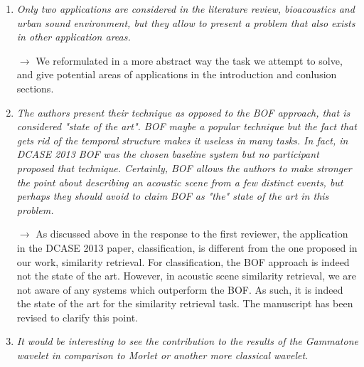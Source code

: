 \documentclass[10pt]{article}
\begin{document}
\begin{enumerate}

\item \emph{Only two applications are considered in the literature review, bioacoustics and urban sound environment, but they allow to present a problem that also exists in other application areas.}

$\rightarrow$ We reformulated in a more abstract way the task we attempt to solve, and give potential areas of applications in the introduction and conlusion sections.

\item \emph{The authors present their technique as opposed to the BOF approach, that is considered "state of the art". BOF maybe a popular technique but the fact that gets rid of the temporal structure makes it useless in many tasks. In fact, in DCASE 2013 BOF was the chosen baseline system but no participant proposed that technique. Certainly, BOF allows the authors to make stronger the point about describing an acoustic scene from a few distinct events, but perhaps they should avoid to claim BOF as "the" state of the art in this problem.}

$\rightarrow$
As discussed above in the response to the first reviewer, the application in the DCASE 2013 paper, classification, is different from the one proposed in our work, similarity retrieval. For classification, the BOF approach is indeed not the state of the art. However, in acoustic scene similarity retrieval, we are not aware of any systems which outperform the BOF. As such, it is indeed the state of the art for the similarity retrieval task. The manuscript has been revised to clarify this point.

\item \emph{It would be interesting to see the contribution to the results of the Gammatone wavelet in comparison to Morlet or another more classical wavelet.}


\end{enumerate}
\end{document}

